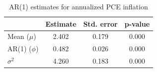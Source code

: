 \begin{table}[htbp]
\caption{AR(1) estimates for annualized PCE inflation}
\label{tab:ar1}
\begin{tabular}{lccc}
\toprule
 & Estimate & Std. error & p-value \\
\midrule
Mean ($\mu$) & 2.402 & 0.179 & 0.000 \\
AR(1) ($\phi$) & 0.482 & 0.026 & 0.000 \\
$\sigma^2$ & 4.260 & 0.183 & 0.000 \\
\bottomrule
\end{tabular}
\end{table}
